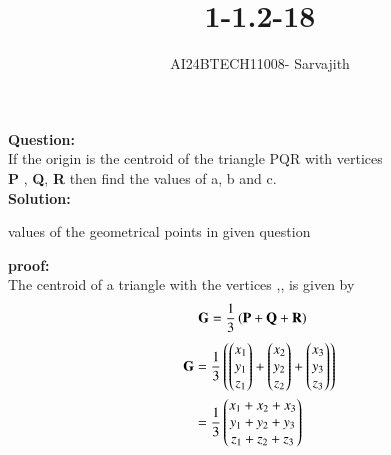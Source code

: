 \documentclass[journal]{IEEEtran}
\begin{document}

\vspace{3cm}

\title{1-1.2-18}
\author{AI24BTECH11008- Sarvajith
}
{\let\newpage\relax\maketitle}

\renewcommand{\thefigure}{\theenumi}
\renewcommand{\thetable}{\theenumi}
\setlength{\intextsep}{10pt} %
\renewcommand{\thetable}{\theenumi}
\textbf{Question: }\\
If the origin is the centroid of the triangle PQR with vertices\\
\textbf{P} , \textbf{Q}, \textbf{R} then find the values of a, b and
c.\\
\textbf{Solution: }\\
\renewcommand{\tablename}{TABLE 1}
\begin{table}[h!]    
  \centering
  
  \caption{values of the geometrical points in given question}
  \label{tab1-1.2-18-1}
\end{table}
\textbf{proof: }\\ 
The centroid  of a triangle with the vertices ,, is given by
\begin{align}
	\mathbf{G} &= \frac{1}{3} \left(\mathbf{P} + \mathbf{Q} + \mathbf{R}\right) \label{eq. 1-1.2-18-1}
\end{align}	
\begin{align}
	\mathbf{G}&=\frac{1}{3} \left( \begin{pmatrix} x_1 \\ y_1 \\z_1\end{pmatrix} + \begin{pmatrix} x_2 \\ y_2 \\z_2 \end{pmatrix} + \begin{pmatrix}x_3 \\ y_3 \\z_3\end{pmatrix}\right)\label{eq. 1-1.2-18-2}\\
	&=\frac{1}{3}\begin{pmatrix} x_1 + x_2 + x_3 \\ y_1 + y_2 + y_3 \\z_1 + z_2 +z_3\end{pmatrix} \label{eq. 1-1.2-18-3}
\end{align}
\end{document}

